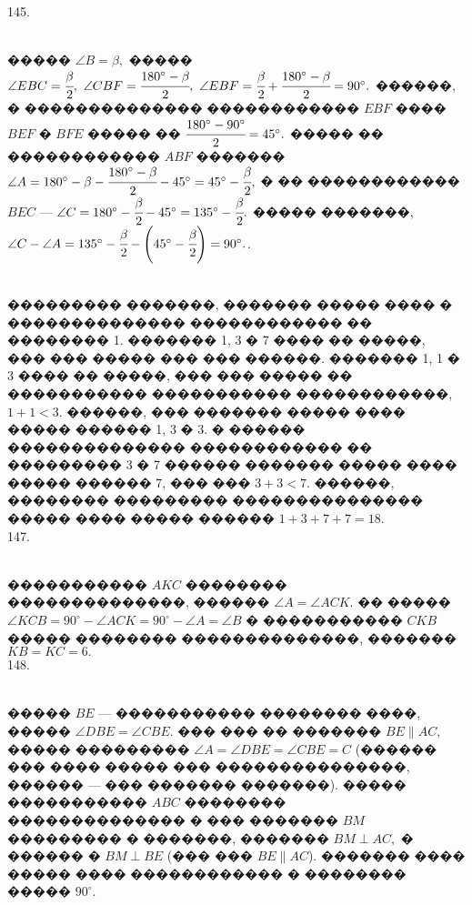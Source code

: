 \documentclass[12pt]{article}
\begin{document}
145. \begin{figure}[ht!]
\end{figure}\\
����� $\angle B=\beta,$ ����� $\angle EBC=\cfrac{\beta}{2},\ \angle CBF=\cfrac{180^\circ-\beta}{2},\ \angle EBF=\cfrac{\beta}{2}+\cfrac{180^\circ-\beta}{2}=90^\circ.$ ������, � �������������� ������������ $EBF$ ���� $BEF$ � $BFE$ ����� �� $\cfrac{180^\circ-90^\circ}{2}=45^\circ.$ ����� �� ������������ $ABF$ ������� $\angle A=180^\circ-\beta-\cfrac{180^\circ-\beta}{2}-45^\circ=45^\circ-\cfrac{\beta}{2},$ � �� ������������ $BEC$ --- $\angle C=180^\circ-\cfrac{\beta}{2}-45^\circ=135^\circ-\cfrac{\beta}{2}.$ ����� �������, $\angle C-\angle A=135^\circ-\cfrac{\beta}{2} -\left(45^\circ-\cfrac{\beta}{2}\right)=90^\circ.$\newpage{}. \begin{figure}[ht!]
\end{figure}\\
��������� �������, ������� ����� ���� � �������������� ������������ �� �������� 1. ������� 1, 3 � 7 ���� �� �����, ��� ��� ����� ��� ��� ������. ������� 1, 1 � 3 ���� �� �����, ��� ��� ����� �� ����������� ����������� ������������,  $1+1<3.$ ������, ��� ������� ����� ���� ����� ������ 1, 3 � 3. � ������ �������������� ������������ �� ��������� 3 � 7 ������ ������� ����� ���� ����� ������ 7, ��� ��� $3+3<7.$ ������, �������� ��������� ��������������� ����� ���� ����� ������ $1+3+7+7=18.$\\
147. \begin{figure}[ht!]
\end{figure}\\
����������� $AKC$ �������� ��������������, ������ $\angle A=\angle ACK.$ �� ����� $\angle KCB=90^\circ-\angle ACK=90^\circ-\angle A=\angle B$ � ����������� $CKB$ ����� �������� ��������������, ������� $KB=KC=6.$\\
148. \begin{figure}[ht!]
\end{figure}\\
����� $BE$ --- ����������� �������� ����, ����� $\angle DBE=\angle CBE.$ ��� ��� �� ������� $BE\parallel AC,$ ����� ��������� $\angle A=\angle DBE=\angle CBE=C$ (������ ��� ���� ����� ��� ���������������, ������ --- ��� ������� �������). ����� ����������� $ABC$ �������� �������������� � ��� ������� $BM$ ��������� � �������, ������� $BM\perp AC,$ � ������ � $BM\perp BE$ (��� ��� $BE\parallel AC$). ������� ���� ����� ���� ������������ � �������� ����� $90^\circ.$\newpage\noindent
\end{document}
